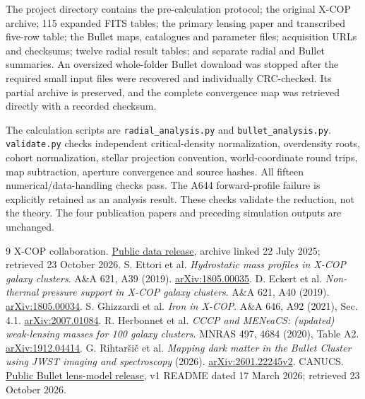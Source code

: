 \documentclass[11pt]{article}
\begin{document}
The project directory contains the pre-calculation protocol; the original X-COP archive; 115 expanded FITS tables; the primary lensing paper and transcribed five-row table; the Bullet maps, catalogues and parameter files; acquisition URLs and checksums; twelve radial result tables; and separate radial and Bullet summaries. An oversized whole-folder Bullet download was stopped after the required small input files were recovered and individually CRC-checked. Its partial archive is preserved, and the complete convergence map was retrieved directly with a recorded checksum.

The calculation scripts are \texttt{radial\_analysis.py} and \texttt{bullet\_analysis.py}. \texttt{validate.py} checks independent critical-density normalization, overdensity roots, cohort normalization, stellar projection convention, world-coordinate round trips, map subtraction, aperture convergence and source hashes. All fifteen numerical/data-handling checks pass. The A644 forward-profile failure is explicitly retained as an analysis result. These checks validate the reduction, not the theory. The four publication papers and preceding simulation outputs are unchanged.

\clearpage
\begin{thebibliography}{9}\small
{} X-COP collaboration. \href{https://dominiqueeckert.wixsite.com/xcop/data}{Public data release}, archive linked 22 July 2025; retrieved 23 October 2026.
 S. Ettori et al. \emph{Hydrostatic mass profiles in X-COP galaxy clusters}. A\&A 621, A39 (2019). \href{https://arxiv.org/abs/1805.00035}{arXiv:1805.00035}.
 D. Eckert et al. \emph{Non-thermal pressure support in X-COP galaxy clusters}. A\&A 621, A40 (2019). \href{https://arxiv.org/abs/1805.00034}{arXiv:1805.00034}.
 S. Ghizzardi et al. \emph{Iron in X-COP}. A\&A 646, A92 (2021), Sec. 4.1. \href{https://arxiv.org/abs/2007.01084}{arXiv:2007.01084}.
 R. Herbonnet et al. \emph{CCCP and MENeaCS: (updated) weak-lensing masses for 100 galaxy clusters}. MNRAS 497, 4684 (2020), Table A2. \href{https://arxiv.org/abs/1912.04414}{arXiv:1912.04414}.
 G. Rihtar\v{s}i\v{c} et al. \emph{Mapping dark matter in the Bullet Cluster using JWST imaging and spectroscopy} (2026). \href{https://arxiv.org/html/2601.22245v2}{arXiv:2601.22245v2}.
 CANUCS. \href{https://niriss.github.io/lensing.html}{Public Bullet lens-model release}, v1 README dated 17 March 2026; retrieved 23 October 2026.
\end{thebibliography}
\end{document}
